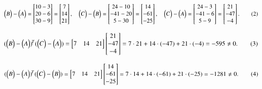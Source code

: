 \documentclass[journal]{IEEEtran}
\begin{document}
\begin{equation}
\begin{pmatrix}B\end{pmatrix}-\begin{pmatrix}A\end{pmatrix}
=\begin{bmatrix}10-3\\20-6\\30-9\end{bmatrix}
=\begin{bmatrix}7\\14\\21\end{bmatrix},
\quad
\begin{pmatrix}C\end{pmatrix}-\begin{pmatrix}B\end{pmatrix}
=\begin{bmatrix}24-10\\-41-20\\5-30\end{bmatrix}
=\begin{bmatrix}14\\-61\\-25\end{bmatrix},
\quad
\begin{pmatrix}C\end{pmatrix}-\begin{pmatrix}A\end{pmatrix}
=\begin{bmatrix}24-3\\-41-6\\5-9\end{bmatrix}
=\begin{bmatrix}21\\-47\\-4\end{bmatrix}.
\tag{2}
\end{equation}

\begin{equation}
(\begin{pmatrix}B\end{pmatrix}-\begin{pmatrix}A\end{pmatrix})^{\!T}(\begin{pmatrix}C\end{pmatrix}-\begin{pmatrix}A\end{pmatrix})
=
\begin{bmatrix}7&14&21\end{bmatrix}
\begin{bmatrix}21\\-47\\-4\end{bmatrix}
=
7\cdot21+14\cdot(-47)+21\cdot(-4)
=-595 \neq 0.
\tag{3}
\end{equation}

\begin{equation}
(\begin{pmatrix}B\end{pmatrix}-\begin{pmatrix}A\end{pmatrix})^{\!T}(\begin{pmatrix}C\end{pmatrix}-\begin{pmatrix}B\end{pmatrix})
=
\begin{bmatrix}7&14&21\end{bmatrix}
\begin{bmatrix}14\\-61\\-25\end{bmatrix}
=
7\cdot14+14\cdot(-61)+21\cdot(-25)
=-1281 \neq 0.
\tag{4}
\end{equation}
\end{document}
